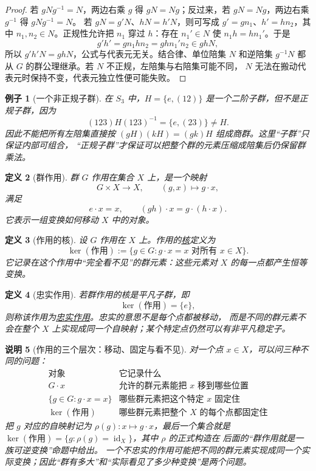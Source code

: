 \documentclass[UTF8,fontset=none,a4paper,11pt]{ctexart}
\theoremstyle{foundation-definition}
\newtheorem{definition}{定义}[section]
\theoremstyle{foundation-theorem}
\theoremstyle{foundation-proposition}
\theoremstyle{foundation-example}
\newtheorem{example}[definition]{例子}
\theoremstyle{foundation-remark}
\newtheorem{remark}[definition]{说明}
\theoremstyle{foundation-theorem}
\newcommand{\term}[2]{\hyperref[#1]{#2}}
\begin{document}
\begin{proof}
若 \(gNg^{-1}=N\)，两边右乘 \(g\) 得 \(gN=Ng\)；反过来，若
\(gN=Ng\)，两边右乘 \(g^{-1}\) 得 \(gNg^{-1}=N\)。
若 \(gN=g'N\)、\(hN=h'N\)，则可写成 \(g'=gn_1\)、\(h'=hn_2\)，其中
\(n_1,n_2\in N\)。正规性允许把 \(n_1\) 穿过 \(h\)：存在 \(n_1'\in N\) 使
\(n_1h=hn_1'\)。于是
\[
g'h'=gn_1hn_2=ghn_1'n_2\in ghN,
\]
所以 \(g'h'N=ghN\)，公式与代表元无关。结合律、单位陪集 \(N\) 和逆陪集
\(g^{-1}N\) 都从 \(G\) 的群公理继承。若 \(N\) 不正规，左陪集与右陪集可能不同，
\(N\) 无法在搬动代表元时保持不变，代表元独立性便可能失败。
\end{proof}

\begin{example}[一个非正规子群]
在 \(S_3\) 中，\(H=\{e,(12)\}\) 是一个二阶子群，但不是正规子群，因为
\[
(123)H(123)^{-1}=\{e,(23)\}\ne H.
\]
因此不能把所有左陪集直接按 \((gH)(kH)=(gk)H\) 组成商群。这里“子群”只保证内部可组合，
“正规子群”才保证可以把整个群的元素压缩成陪集后仍保留群乘法。
\end{example}

\begin{definition}[群作用]\label{def:group-action}
群 \(G\) 作用在集合 \(X\) 上，是一个映射
\[
G\times X\to X,\qquad (g,x)\mapsto g\cdot x,
\]
满足
\[
e\cdot x=x,\qquad
(gh)\cdot x=g\cdot(h\cdot x).
\]
它表示一组变换如何移动 \(X\) 中的对象。
\end{definition}

\begin{definition}[作用的核]\label{def:action-kernel}
设 \(G\) 作用在 \(X\) 上。作用的\term{def:action-kernel}{核}定义为
\[
  \ker(\text{作用})
  :=\{g\in G:g\cdot x=x\text{ 对所有 }x\in X\}.
\]
它记录在这个作用中“完全看不见”的群元素：这些元素对 \(X\) 的每一点都产生恒等变换。
\end{definition}

\begin{definition}[忠实作用]\label{def:faithful-action}
若群作用的核是平凡子群，即
\[
  \ker(\text{作用})=\{e\},
\]
则称该作用为\term{def:faithful-action}{忠实作用}。忠实的意思不是每个点都被移动，
而是不同的群元素不会在整个 \(X\) 上实现成同一个自映射；某个特定点仍然可以有非平凡稳定子。
\end{definition}

\begin{remark}[作用的三个层次：移动、固定与看不见]
对一个点 \(x\in X\)，可以问三种不同的问题：
\[
\begin{array}{c|c}
\text{对象}&\text{它记录什么}\\
\hline
G\cdot x&\text{允许的群元素能把 }x\text{ 移到哪些位置}\\
\{g\in G:g\cdot x=x\}&\text{哪些群元素把这个特定 }x\text{ 固定住}\\
\ker(\text{作用})&\text{哪些群元素把整个 }X\text{ 的每个点都固定住}
\end{array}
\]
把 \(g\) 对应的自映射记为 \(\rho(g):x\mapsto g\cdot x\)，最后一个集合就是
\(\ker(\text{作用})=\{g:\rho(g)=\operatorname{id}_X\}\)，其中 \(\rho\) 的正式构造在
后面的“群作用就是一族可逆变换”命题中给出。
一个不忠实的作用可能把不同的群元素实现成同一个实际变换；因此“群有多大”和“实际看见了多少种变换”是两个问题。
\end{remark}
\end{document}
